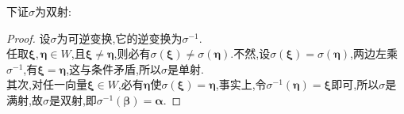 \documentclass[lang=cn,11pt,normal]{elegantbook}
\begin{document}
	下证$\sigma$为双射:
	\begin{proof}
		设$\sigma$为可逆变换,它的逆变换为$\sigma^{-1}$.\\
		任取$\boldsymbol{\xi},\boldsymbol{\eta}\in W$,且$\boldsymbol{\xi}\ne\boldsymbol{\eta}$,则必有$\sigma(\boldsymbol{\xi})\ne\sigma(\boldsymbol{\eta})$.不然,设$\sigma(\boldsymbol{\xi})=\sigma(\boldsymbol{\eta})$,两边左乘$\sigma^{-1}$,有$\boldsymbol{\xi}=\boldsymbol{\eta}$,这与条件矛盾,所以$\sigma$是单射.\\
		其次,对任一向量$\boldsymbol{\xi}\in W$,必有$\boldsymbol{\eta}$使$\sigma(\boldsymbol{\xi})=\boldsymbol{\eta}$,事实上,令$\sigma^{-1}(\boldsymbol{\eta})=\boldsymbol{\xi}$即可,所以$\sigma$是满射,故$\sigma$是双射,即$\sigma^{-1}(\boldsymbol{\beta})=\boldsymbol{\alpha}$.
	\end{proof}
\end{document}
